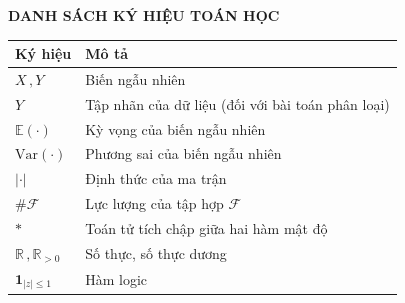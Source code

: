 \makeatletter
\begin{titlepage}
	
	\begin{center}
		{\fontsize{14}{0pt}\selectfont\bf DANH SÁCH KÝ HIỆU TOÁN HỌC}
	\end{center}
	\vspace{50pt}
	

\begin{table}[H]
	\centering
	\begin{tabular}{ll} 
		\toprule
\bf Ký hiệu & \bf Mô tả\\ \midrule
		$X\,,Y$ & Biến ngẫu nhiên \\
		$Y$ & Tập nhãn của dữ liệu (đối với bài toán phân loại)\\
		$\mathbb{E}(\cdot)$ &  Kỳ vọng của biến ngẫu nhiên\\
		$\mathrm{Var}(\cdot)$ & Phương sai của biến ngẫu nhiên\\
	$|\cdot|$ & Định thức của ma trận\\
	$\#\mathcal{F}$ & Lực lượng của tập hợp $\mathcal{F}$\\ 
	$*$ & Toán tử tích chập giữa hai hàm mật độ\\
	$\mathbb{R}\,,\mathbb{R}_{>0}$ & Số thực, số thực dương\\
	$\bm1_{|z| \leq 1}$ & Hàm logic\\
		\bottomrule
	\end{tabular}
\end{table}

	
	
\end{titlepage}

